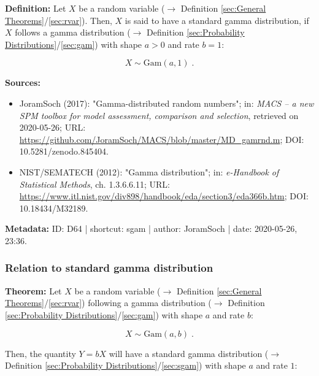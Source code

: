 \documentclass[a4paper,12pt,twoside]{book}
\begin{document}
\textbf{Definition:} Let $X$ be a random variable ($\rightarrow$ Definition \ref{sec:General Theorems}/\ref{sec:rvar}). Then, $X$ is said to have a standard gamma distribution, if $X$ follows a gamma distribution ($\rightarrow$ Definition \ref{sec:Probability Distributions}/\ref{sec:gam}) with shape $a > 0$ and rate $b = 1$:

\begin{equation} \label{eq:sgam-sgam}
X \sim \mathrm{Gam}(a, 1) \; .
\end{equation}


\vspace{1em}
\textbf{Sources:}
\begin{itemize}
\item JoramSoch (2017): "Gamma-distributed random numbers"; in: \textit{MACS – a new SPM toolbox for model assessment, comparison and selection}, retrieved on 2020-05-26; URL: \url{https://github.com/JoramSoch/MACS/blob/master/MD_gamrnd.m}; DOI: 10.5281/zenodo.845404.
\item NIST/SEMATECH (2012): "Gamma distribution"; in: \textit{e-Handbook of Statistical Methods}, ch. 1.3.6.6.11; URL: \url{https://www.itl.nist.gov/div898/handbook/eda/section3/eda366b.htm}; DOI: 10.18434/M32189.
\end{itemize}


\vspace{1em}
\textbf{Metadata:} ID: D64 | shortcut: sgam | author: JoramSoch | date: 2020-05-26, 23:36.
\vspace{1em}



\subsubsection[\textbf{Relation to standard gamma distribution}]{Relation to standard gamma distribution} \label{sec:gam-sgam}
\setcounter{equation}{0}

\textbf{Theorem:} Let $X$ be a random variable ($\rightarrow$ Definition \ref{sec:General Theorems}/\ref{sec:rvar}) following a gamma distribution ($\rightarrow$ Definition \ref{sec:Probability Distributions}/\ref{sec:gam}) with shape $a$ and rate $b$:

\begin{equation} \label{eq:gam-sgam-X-gam}
X \sim \mathrm{Gam}(a,b) \; .
\end{equation}

Then, the quantity $Y = b X$ will have a standard gamma distribution ($\rightarrow$ Definition \ref{sec:Probability Distributions}/\ref{sec:sgam}) with shape $a$ and rate $1$:
\end{document}
